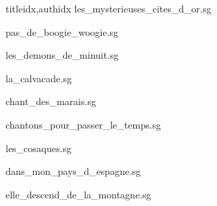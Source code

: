 \documentclass[12pt]{article}
\begin{document}
\begin{songs}{titleidx,authidx}
{les_mysterieuses_cites_d_or.sg}


{pas_de_boogie_woogie.sg}


{les_demons_de_minuit.sg}


{la_calvacade.sg}


{chant_des_marais.sg}


{chantons_pour_passer_le_temps.sg}


{les_cosaques.sg}


{dans_mon_pays_d_espagne.sg}


{elle_descend_de_la_montagne.sg}


\end{songs}
\end{document}
